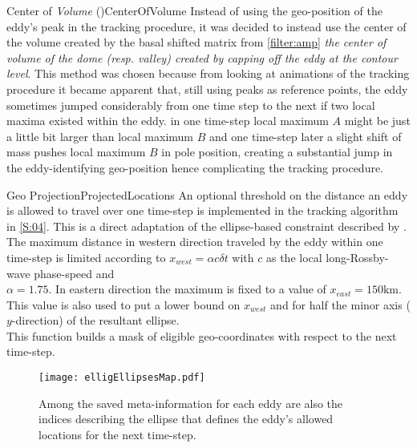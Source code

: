 \begin{filter}{Center of \textit{Volume} (\CoV)}{CenterOfVolume}
\label{filter:CoV}
Instead of using the geo-position of the eddy's peak in the tracking procedure,
it was decided to instead use the center of the volume created by the basal
shifted matrix from \cref{filter:amp} \ie \textit{the center of volume of the
dome
(resp. valley) created by capping off the eddy at the contour level}.
This method was chosen because from looking at animations of the tracking
procedure
it became apparent that, still using peaks as reference points, the eddy
sometimes jumped considerably from one time step to the next if two local maxima
existed within the eddy. \Eg in one time-step local maximum $A$ might be just a
little bit larger than local maximum $B$ and one time-step later a slight shift
of mass pushes local maximum $B$ in pole position, creating a substantial jump
in the eddy-identifying geo-position hence complicating the tracking procedure.
\end{filter}\newline
\begin{filter}{Geo Projection}{ProjectedLocations}
\label{filter:projLocs}
An optional threshold on the distance an eddy is allowed to travel over one time-step is implemented in the tracking algorithm in \cref{S:04}. This is a direct adaptation of the ellipse-based constraint described by \citet{Chelton2011}. The maximum distance in western direction traveled by the eddy within one time-step is limited according to $x_{west} = \alpha c \delta{t} $ with $c$ as the local long-Rossby-wave phase-speed and \\ \eg $\alpha=1.75$. In eastern direction the maximum is fixed to a value of \eg $x_{east} = 150\mathrm{km}$. This value is also used to put a lower bound on $x_{west}$ and for half the minor axis ($y$-direction) of the resultant ellipse.   \\
This function builds a mask of eligible geo-coordinates with respect to the next time-step.
\end{filter}\newline

\begin{figure}
		\texttt{[image: elligEllipsesMap.pdf]}
		\caption{Among the saved meta-information for each eddy are also the indices describing the ellipse that defines the eddy's allowed locations for the next time-step.}
		\label{fig:elligEllipse}
\end{figure}
\newpage
